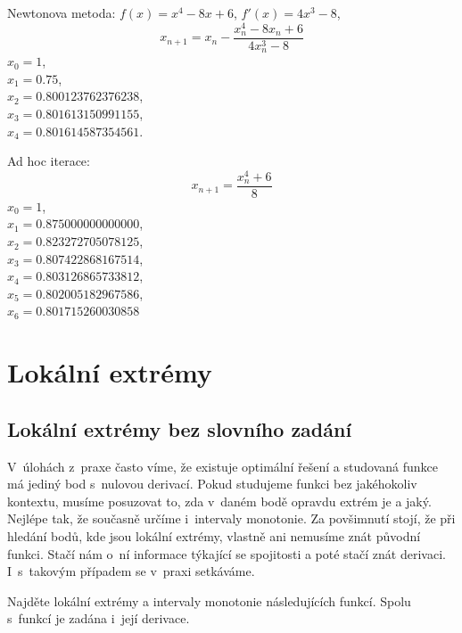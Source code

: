 \reseni

Newtonova metoda: $f(x)=x^4-8x+6$, $f'(x)=4x^3-8$, $$x_{n+1}=x_n-\frac{x_n^4-8x_n+6}{4x_n^3-8}$$
$x_0=1$,\\ $x_1=0.75$,\\ $x_2=0.800123762376238$,\\ $x_3=0.801613150991155$,\\ $x_4=0.801614587354561$.

Ad hoc iterace: $$x_{n+1}=\frac{x_n^4+6}{8}$$
$x_0=1$,\\ $x_1=0.875000000000000$,\\ $x_2=0.823272705078125$,\\ $x_3=0.807422868167514$,\\ $x_4=0.803126865733812$,\\ $x_5=0.802005182967586$,\\ $x_6=0.801715260030858$

\konec

\stranka
\section{Lokální extrémy}

\stranka
\subsection{Lokální extrémy bez slovního zadání} V úlohách z praxe často
víme, že existuje optimální řešení a studovaná funkce má jediný bod s nulovou derivací. Pokud studujeme funkci bez jakéhokoliv kontextu,
musíme posuzovat to, zda v daném bodě opravdu extrém je a
jaký. Nejlépe tak, že současně určíme i intervaly monotonie. Za
povšimnutí stojí, že při hledání bodů, kde jsou lokální extrémy,
vlastně ani nemusíme znát původní funkci. Stačí nám o ní informace
týkající se spojitosti a poté stačí znát derivaci. I~s~takovým
případem se v praxi setkáváme.


Najděte lokální extrémy a intervaly monotonie následujících funkcí. Spolu s funkcí je zadána i její derivace.



